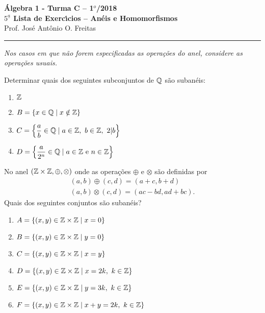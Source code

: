 \documentclass[12pt]{article}
\begin{document}


\begin{center}
 {\Large\bf {\'A}lgebra 1 - Turma C -- 1$^{o}$/2018} \\
 \vspace{9pt} {\large\bf $5^{\underline{a}}$ Lista de Exerc{\'\i}cios -- Anéis e Homomorfismos}\\
 \vspace{9pt} Prof. Jos{\'e} Ant{\^o}nio O. Freitas
\end{center}
\hrule

\vspace{.6cm}

\textit{Nos casos em que não forem especificadas as operações do anel, considere as operações usuais.}

\vspace{.6cm}

\questao{}
	Determinar quais dos seguintes subconjuntos de $\mathbb{Q}$ s{\~a}o suban{\'e}is:
	\begin{multicols}{2}
		\begin{enumerate}[label=({\alph*})]
			\item $\mathbb{Z}$
			\item $B = \{x \in \mathbb{Q} \mid x \notin \mathbb{Z}\}$
			\item $C = \left\{\dfrac{a}{b} \in \mathbb{Q} \mid a \in \mathbb{Z},\ b \in \mathbb{Z},\ 2 |b \right\}$
			\item $D = \left\{\dfrac{a}{2^n} \in \mathbb{Q} \mid a \in \mathbb{Z} \mbox{ e } n \in \mathbb{Z} \right\}$
		\end{enumerate}
	\end{multicols}
 

\vesp

\questao{} No anel $(\mathbb{Z} \times \mathbb{Z}, \oplus, \otimes)$ onde as opera\c{c}\~oes $\oplus$ e $\otimes$ são definidas por
\begin{align*}
	(a, b) \oplus (c, d) = (a + c, b + d)\\
	(a ,b) \otimes (c, d) = (ac - bd, ad + bc).
\end{align*}
Quais dos seguintes conjuntos são subanéis?
\begin{enumerate}[label=({\alph*})]
	\item $A = \{(x, y) \in \mathbb{Z} \times \mathbb{Z} \mid x = 0\}$
	\item $B = \{(x, y) \in \mathbb{Z} \times \mathbb{Z} \mid y = 0\}$
	\item $C = \{(x, y) \in \mathbb{Z} \times \mathbb{Z} \mid x = y\}$
	\item $D = \{(x, y) \in \mathbb{Z} \times \mathbb{Z} \mid x = 2k,\ k \in \mathbb{Z}\}$
	\item $E = \{(x, y) \in \mathbb{Z} \times \mathbb{Z} \mid y = 3k,\ k \in \mathbb{Z}\}$
	\item $F = \{(x, y) \in \mathbb{Z} \times \mathbb{Z} \mid x + y = 2k,\ k \in \mathbb{Z}\}$
\end{enumerate}
\end{document}
